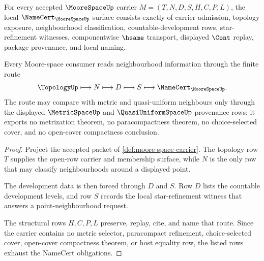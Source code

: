 \begin{theorem}
\label{thm:moore-space-namecert-obligations}
For every accepted $\MooreSpaceUp$ carrier $M=(T,N,D,S,H,C,P,L)$, the local $\NameCert_{\MooreSpaceUp}$ surface consists exactly of carrier admission, topology exposure, neighbourhood classification, countable-development rows, star-refinement witnesses, componentwise $\hsame$ transport, displayed $\Cont$ replay, package provenance, and local naming.

Every Moore-space consumer reads neighbourhood information through the finite route
$$
\TopologyUp \longmapsto N \longmapsto D \longmapsto S \longmapsto \NameCert_{\MooreSpaceUp}.
$$
The route may compare with metric and quasi-uniform neighbours only through the displayed $\MetricSpaceUp$ and $\QuasiUniformSpaceUp$ provenance rows; it exports no metrization theorem, no paracompactness theorem, no choice-selected cover, and no open-cover compactness conclusion.
\end{theorem}
\begin{proof}
Project the accepted packet of \autoref{def:moore-space-carrier}. The topology row $T$ supplies the open-row carrier and membership surface, while $N$ is the only row that may classify neighbourhoods around a displayed point.

The development data is then forced through $D$ and $S$. Row $D$ lists the countable development levels, and row $S$ records the local star-refinement witness that answers a point-neighbourhood request.

The structural rows $H,C,P,L$ preserve, replay, cite, and name that route. Since the carrier contains no metric selector, paracompact refinement, choice-selected cover, open-cover compactness theorem, or host equality row, the listed rows exhaust the NameCert obligations.
\end{proof}


